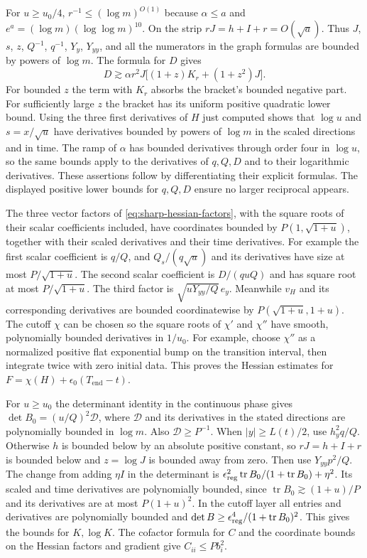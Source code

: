 \documentclass[11pt]{article}
\newcommand{\1}{\mathbf{1}}
\numberwithin{equation}{section}
\newcommand{\tr}{\operatorname{tr}}
\begin{document}
For \(u\ge u_0/4\), \(r^{-1}\le(\log m)^{O(1)}\) because
\(\alpha\le a\) and \(e^a=(\log m)(\log\log m)^{10}\).
On the strip \(rJ=h+I+r=O(\sqrt a)\). Thus \(J\), \(s\), \(z\),
\(Q^{-1}\), \(q^{-1}\), \(Y_y\), \(Y_{yy}\), and all the numerators
in the graph formulas are bounded by powers of \(\log m\).
The formula for \(D\) gives
\[
 D\gtrsim \alpha r^2J\big[(1+z)K_r+(1+z^2)J\big].
\]
For bounded \(z\) the term with \(K_r\) absorbs the bracket's
bounded negative part. For sufficiently large \(z\) the bracket
has its uniform positive quadratic lower bound.
Using the three first derivatives of \(H\) just computed shows
that \(\log u\) and \(s=x/\sqrt u\) have derivatives bounded by
powers of \(\log m\) in the scaled directions and in time.
The ramp of \(\alpha\) has bounded derivatives through order four
in \(\log u\), so the same bounds apply to the derivatives of
\(q,Q,D\) and to their logarithmic derivatives. These assertions
follow by differentiating their explicit formulas. The displayed
positive lower bounds for \(q,Q,D\) ensure no larger reciprocal
appears.

The three vector factors of \eqref{eq:sharp-hessian-factors},
with the square roots of their scalar coefficients included,
have coordinates bounded by \(P(1,\sqrt{1+u})\), together
with their scaled derivatives and their time derivatives.
For example the first scalar coefficient is \(q/Q\), and
\(Q_s/(q\sqrt{u})\) and its derivatives have size at most
\(P/\sqrt{1+u}\). The second scalar coefficient is \(D/(q uQ)\)
and has square root at most \(P/\sqrt{1+u}\). The third
factor is \(\sqrt{uY_{yy}/Q}\,e_y\).
Meanwhile \(v_H\) and its corresponding derivatives are bounded
coordinatewise by \(P(\sqrt{1+u},1+u)\).
The cutoff \(\chi\) can be chosen so the square roots of
\(\chi'\) and \(\chi''\) have smooth, polynomially bounded
derivatives in \(1/u_0\). For example, choose \(\chi''\) as a
normalized positive flat exponential bump on the transition
interval, then integrate twice with zero initial data.
This proves the Hessian estimates for \(F=\chi(H)+
\epsilon_0(T_{\mathrm{end}}-t)\).

For \(u\ge u_0\) the determinant identity in the continuous
phase gives \(\det B_0=(u/Q)^2\mathcal D\), where
\(\mathcal D\) and its derivatives in the stated directions are
polynomially bounded in \(\log m\). Also \(\mathcal D\ge P^{-1}\).
When \(|y|\ge L(t)/2\), use \(h_y^2q/Q\). Otherwise \(h\) is
bounded below by an absolute positive constant, so \(rJ=h+I+r\)
is bounded below and \(z=\log J\) is bounded away from zero.
Then use \(Y_{yy}p^2/Q\). The change from adding \(\eta I\)
in the determinant is
\(\epsilon_{\rm reg}^2\tr B_0/(1+\tr B_0)+\eta^2\).
Its scaled and time derivatives are polynomially bounded, since
\(\tr B_0\gtrsim (1+u)/P\) and its derivatives are at most
\(P(1+u)^2\). In the cutoff layer all entries and derivatives
are polynomially bounded and
\(\det B\ge\epsilon_{\rm reg}^4/(1+\tr B_0)^2\).
This gives the bounds for \(K,\log K\).
The cofactor formula for \(C\) and the coordinate bounds on the
Hessian factors and gradient give \(C_{ii}\le P b_i^2\).
\end{document}
